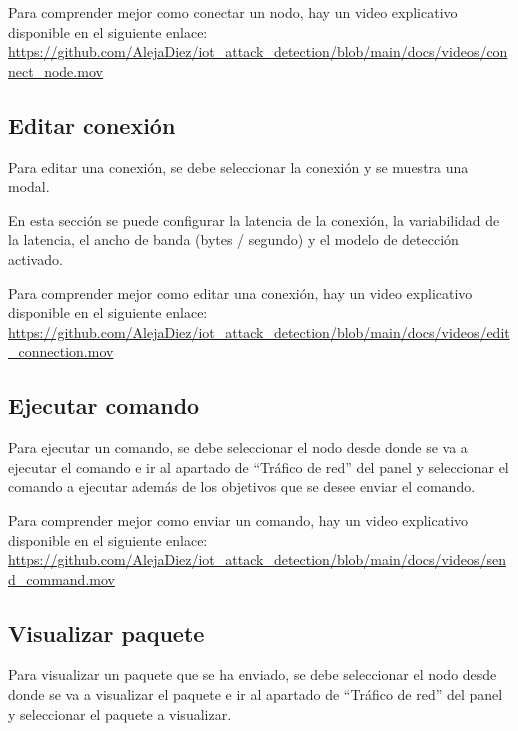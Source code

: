 
Para comprender mejor como conectar un nodo, hay un video explicativo disponible en el siguiente enlace: \url{https://github.com/AlejaDiez/iot_attack_detection/blob/main/docs/videos/connect_node.mov}

\subsection{Editar conexión}
\label{subsec:EditarConexion}
Para editar una conexión, se debe seleccionar la conexión y se muestra una modal.


En esta sección se puede configurar la latencia de la conexión, la variabilidad de la latencia, el ancho de banda (bytes / segundo) y el modelo de detección activado.

Para comprender mejor como editar una conexión, hay un video explicativo disponible en el siguiente enlace: \url{https://github.com/AlejaDiez/iot_attack_detection/blob/main/docs/videos/edit_connection.mov}

\subsection{Ejecutar comando}
\label{subsec:EjecutarComando}
Para ejecutar un comando, se debe seleccionar el nodo desde donde se va a ejecutar el comando e ir al apartado de ``Tráfico de red'' del panel y seleccionar el comando a ejecutar además de los objetivos que se desee enviar el comando.


Para comprender mejor como enviar un comando, hay un video explicativo disponible en el siguiente enlace: \url{https://github.com/AlejaDiez/iot_attack_detection/blob/main/docs/videos/send_command.mov}

\subsection{Visualizar paquete}
\label{subsec:VisualizarPaquete}
Para visualizar un paquete que se ha enviado, se debe seleccionar el nodo desde donde se va a visualizar el paquete e ir al apartado de ``Tráfico de red'' del panel y seleccionar el paquete a visualizar.


